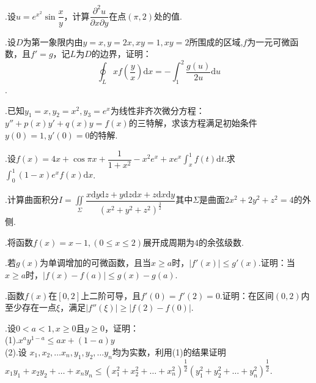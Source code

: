 \documentclass[UTF8]{ctexart}
\begin{document}
.设$u=e^{x^{2}}\sin\dfrac{x}{y}$，计算$\dfrac{\partial^{2}u}{\partial x\partial y}$在点$\left(\pi,2\right)$处的值.


.设$D$为第一象限内由$y=x,y=2x,xy=1,xy=2$所围成的区域,$f$为一元可微函数，且$f'=g$，记$L$为$D$的边界，证明：
\[\oint_{L}xf\left(\frac{y}{x}\right)\mathrm{d}x=-\int_{1}^{2}\frac{g\left(u\right)}{2u}\mathrm{d}u\].


.已知$y_{1}=x,y_{2}=x^{2},y_{3}=e^x$为线性非齐次微分方程：$ y''+p(x)y'+q(x)y=f(x) $的三特解，求该方程满足初始条件$ y(0)=1,y'(0)=0 $的特解.


.设$ f(x)=4x+\cos{\pi}{x}+\dfrac{1}{1+x^2}-x^2e^x+xe^x\int_{x}^{1}f(t)\mathrm{d}t $.求$ \int_{0}^{1}(1-x)e^xf(x)\mathrm{d}x $.


.计算曲面积分$ I=\underset{\Sigma}\iint\dfrac{x\mathrm{d}y\mathrm{d}z+y\mathrm{d}z\mathrm{d}x+z\mathrm{d}x\mathrm{d}y}{(x^2+y^2+z^2)^\frac{3}{2}} $其中$ \Sigma $是曲面$ 2x^2+2y^2+z^2=4 $的外侧.


.将函数$ f(x)=x-1,(0\le{x}\le{2}) $展开成周期为$ 4 $的余弦级数.


.若$ g(x) $为单调增加的可微函数，且当$ x\ge{a} $时，$ \left|f'(x)\right|\le{g'(x)} $.证明：当$ x\ge{a} $时，$ \left|f(x)-f(a)\right|\le{g(x)-g(a)} $.


.函数$ f(x) $在$ [0,2] $上二阶可导，且$ f'(0)=f'(2)=0 $.证明：在区间$ (0,2) $内至少存在一点$ \xi $，满足$ \left|f''(\xi)\right|\ge\left|f(2)-f(0)\right| $.


.设$ 0<a<1,x\ge0 $且$ y\ge0 $，证明： \\(1).$x^ay^{1-a}\le{ax+(1-a)y} $\\
(2).设 $x_1,x_2,\ldots x_n,y_1,y_2,\ldots y_n $均为实数，利用(1)的结果证明$ x_1y_1+x_2y_2+\ldots +x_ny_n\le (x_1^2+x_2^2+\ldots+x_n^2)^{\dfrac{1}{2}} (y_1^2+y_2^2+\ldots+y_n^2)^{\dfrac{1}{2}}$.
\thispagestyle{empty}
\end{document}
